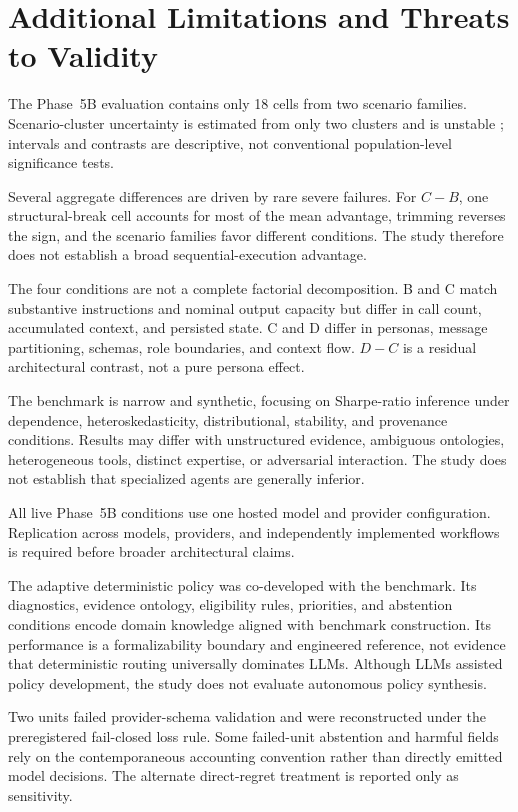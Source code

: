 \section{Additional Limitations and Threats to Validity}
\label{supp:limitations}

The Phase~5B evaluation contains only 18 cells from two scenario families.
Scenario-cluster uncertainty is estimated from only two clusters and is
unstable \citep{MacKinnonWebb2018}; intervals and contrasts are descriptive,
not conventional population-level significance tests.

Several aggregate differences are driven by rare severe failures.  For
\(C-B\), one structural-break cell accounts for most of the mean advantage,
trimming reverses the sign, and the scenario families favor different
conditions.  The study therefore does not establish a broad
sequential-execution advantage.

The four conditions are not a complete factorial decomposition.  B and C
match substantive instructions and nominal output capacity but differ in call
count, accumulated context, and persisted state.  C and D differ in personas,
message partitioning, schemas, role boundaries, and context flow.  \(D-C\) is
a residual architectural contrast, not a pure persona effect.

The benchmark is narrow and synthetic, focusing on Sharpe-ratio inference
under dependence, heteroskedasticity, distributional, stability, and
provenance conditions.  Results may differ with unstructured evidence,
ambiguous ontologies, heterogeneous tools, distinct expertise, or adversarial
interaction.  The study does not establish that specialized agents are
generally inferior.

All live Phase~5B conditions use one hosted model and provider configuration.
Replication across models, providers, and independently implemented workflows
is required before broader architectural claims.

The adaptive deterministic policy was co-developed with the benchmark.  Its
diagnostics, evidence ontology, eligibility rules, priorities, and abstention
conditions encode domain knowledge aligned with benchmark construction.  Its
performance is a formalizability boundary and engineered reference, not
evidence that deterministic routing universally dominates LLMs.  Although
LLMs assisted policy development, the study does not evaluate autonomous
policy synthesis.

Two units failed provider-schema validation and were reconstructed under the
preregistered fail-closed loss rule.  Some failed-unit abstention and harmful
fields rely on the contemporaneous accounting convention rather than directly
emitted model decisions.  The alternate direct-regret treatment is reported
only as sensitivity.

